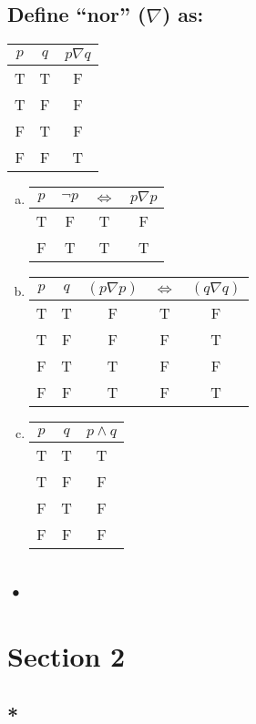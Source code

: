 \documentclass[12pt]{scrartcl} %
\begin{document}
\subsection{Define ``nor'' ($\nabla$) as:}

\begin{center}
\begin{tabular}{*{2}{c}|*{1}{c}}$p$&$q$&$p \nabla q$\\
\hline
T&T&F\\
T&F&F\\
F&T&F\\
F&F&T\\
\end{tabular}
\end{center}

\begin{enumerate}[(a)]
	\item \begin{tabular}{*{1}{c}|*{3}{c}}$p$&$\neg p$&$\iff$&$p \nabla p$\\
			\hline	
			T&F&T&F\\
			F&T&T&T\\
			\end{tabular}	
	\item \begin{tabular}{*{2}{c}|*{3}{c}}$p$&$q$&$(p \nabla p)$&$\iff$&$(q \nabla q)$\\
			\hline
			T&T&F&T&F\\
			T&F&F&F&T\\
			F&T&T&F&F\\
			F&F&T&F&T\\
		  \end{tabular}
		  
	\item \begin{tabular}{*{2}{c}|*{1}{c}}$p$&$q$&$p \land q$\\
			\hline
			T&T&T\\
			T&F&F\\
			F&T&F\\
			F&F&F\\
		  \end{tabular}
\end{enumerate}

\subsection{•}
\section{Section 2}

\subsection{*}
\end{document}
